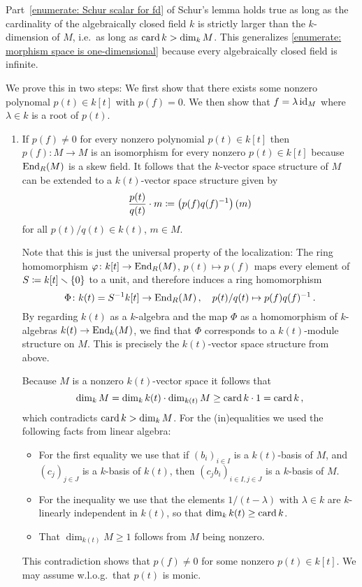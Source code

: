 \begin{remark}
  \label{remark: Schur for cardinality big enough}
  Part~\ref{enumerate: Schur scalar for fd} of Schur’s lemma holds true as long as the cardinality of the algebraically closed field $k$ is strictly larger than the $k$-dimension of $M$, i.e.\ as long as $\operatorname{card} k > \dim_k M$.
  This generalizes \ref{enumerate: morphism space is one-dimensional} because every algebraically closed field is infinite.

  We prove this in two steps:
  We first show that there exists some nonzero polynomal $p(t) \in k[t]$ with $p(f) = 0$.
  We then show that $f = \lambda \operatorname{id}_M$ where $\lambda \in k$ is a root of $p(t)$.
  \begin{enumerate}[label=\arabic*)]
    \item
      If $p(f) \neq 0$ for every nonzero polynomial $p(t) \in k[t]$ then $p(f) \colon M \to M$ is an isomorphism for every nonzero $p(t) \in k[t]$ because $\operatorname{End}_R(M)$ is a skew field.
      It follows that the $k$-vector space structure of $M$ can be extended to a $k(t)$-vector space structure given by
      \[
                  \frac{p(t)}{q(t)} \cdot m
        \coloneqq  \left( p(f) q(f)^{-1} \right)(m)
      \]
      for all $p(t)/q(t) \in k(t)$, $m \in M$.
      
      Note that this is just the universal property of the localization:
      The ring homomorphism $\varphi \colon k[t] \to \operatorname{End}_R(M)$, $p(t) \mapsto p(f)$ maps every element of $S \coloneqq k[t] \smallsetminus \{0\}$ to a unit, and therefore induces a ring homomorphism
      \[
                \Phi
        \colon  k(t)
        =       S^{-1} k[t]
        \to     \operatorname{End}_R(M) \,,
        \quad   p(t)/q(t)
        \mapsto p(f) q(f)^{-1} \,.
      \]
      By regarding $k(t)$ as a $k$-algebra and the map $\Phi$ as a homomorphism of $k$-algebras $k(t) \to \operatorname{End}_k(M)$, we find that $\Phi$ corresponds to a $k(t)$-module structure on $M$.
      This is precisely the $k(t)$-vector space structure from above.
      
      Because $M$ is a nonzero $k(t)$-vector space it follows that
      \[
              \dim_k M
        =     \dim_k k(t) \cdot \dim_{k(t)} M
        \geq  \operatorname{card} k \cdot 1
        =     \operatorname{card} k \,,
      \]
      which contradicts $\operatorname{card} k > \dim_k M$.
      For the (in)equalities we used the following facts from linear algebra:
      \begin{itemize}
        \item
          For the first equality we use that if $(b_i)_{i \in I}$ is a $k(t)$-basis of $M$, and $(c_j)_{j \in J}$ is a $k$-basis of $k(t)$, then $(c_j b_i)_{i \in I, j \in J}$ is a $k$-basis of $M$.
        \item
          For the inequality we use that the elements $1/(t-\lambda)$ with $\lambda \in k$ are $k$-linearly independent in $k(t)$, so that $\dim_k k(t) \geq \operatorname{card} k$.
        \item
          That $\dim_{k(t)} M \geq 1$ follows from $M$ being nonzero.
      \end{itemize}
      This contradiction shows that $p(f) \neq 0$ for some nonzero $p(t) \in k[t]$.
      We may assume w.l.o.g.\ that $p(t)$ is monic.
      

\end{enumerate}
\end{remark}
